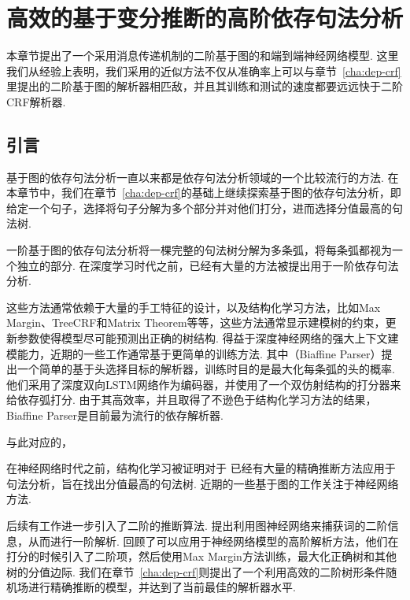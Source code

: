 \chapter{高效的基于变分推断的高阶依存句法分析}\label{cha:approximate-vi}

本章节提出了一个采用消息传递机制的二阶基于图的和端到端神经网络模型.
这里我们从经验上表明，我们采用的近似方法不仅从准确率上可以与章节~\ref{cha:dep-crf}里提出的二阶基于图的解析器相匹敌，并且其训练和测试的速度都要远远快于二阶CRF解析器.

\section{引言}\label{sec:vi-intro}
基于图的依存句法分析一直以来都是依存句法分析领域的一个比较流行的方法.
在本章节中，我们在章节~\ref{cha:dep-crf}的基础上继续探索基于图的依存句法分析，即给定一个句子，选择将句子分解为多个部分并对他们打分，进而选择分值最高的句法树.

一阶基于图的依存句法分析将一棵完整的句法树分解为多条弧，将每条弧都视为一个独立的部分.
在深度学习时代之前，已经有大量的方法被提出用于一阶依存句法分析\cite{mcdonald-pereira-2006-online,koo-etal-2007-structured,ma-hovy-2017-neural,dozat-etal-2017-biaffine}.

这些方法通常依赖于大量的手工特征的设计，以及结构化学习方法，比如Max Margin、TreeCRF和Matrix Theorem等等，这些方法通常显示建模树的约束，更新参数使得模型尽可能预测出正确的树结构.
得益于深度神经网络的强大上下文建模能力，近期的一些工作通常基于更简单的训练方法.
其中\cite{dozat-etal-2017-biaffine}（Biaffine Parser）提出一个简单的基于头选择目标的解析器，训练时目的是最大化每条弧的头的概率.
他们采用了深度双向LSTM网络作为编码器，并使用了一个双仿射结构的打分器来给依存弧打分.
由于其高效率，并且取得了不逊色于结构化学习方法的结果\cite{zhang-etal-2019-empirical,falenska-kuhn-2019-non}，Biaffine Parser是目前最为流行的依存解析器.

与此对应的，

在神经网络时代之前，结构化学习被证明对于
已经有大量的精确推断方法\cite{mcdonald-pereira-2006-online,carreras-2007-experiments,koo-collins-2010-efficient,ma-zhao-2012-fourth}应用于句法分析，旨在找出分值最高的句法树.
近期的一些基于图的工作关注于神经网络方法\cite{chen-manning-2014-fast,kiperwasser-goldberg-2016-simple,dozat-etal-2017-biaffine,ma-hovy-2017-neural}.

后续有工作进一步引入了二阶的推断算法.
\cite{ji-etal-2019-graph}提出利用图神经网络来捕获词的二阶信息，从而进行一阶解析.
\cite{fonseca-martins-2020-revisiting}回顾了可以应用于神经网络模型的高阶解析方法，他们在打分的时候引入了二阶项，然后使用Max Margin方法训练，最大化正确树和其他树的分值边际.
我们在章节~\ref{cha:dep-crf}则提出了一个利用高效的二阶树形条件随机场进行精确推断的模型，并达到了当前最佳的解析器水平.

